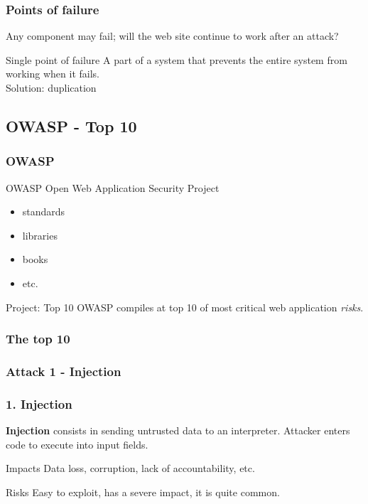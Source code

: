 
\begin{frame}
\frametitle{Points of failure}
Any component may fail; will the web site continue to work after an attack?
\begin{block}{Single point of failure}
A part of a system that prevents the entire system from working when it fails.
\\ Solution: duplication
\end{block}
\end{frame}

\subsection{OWASP - Top 10}

\begin{frame}
\frametitle{OWASP}
\begin{block}{OWASP}
\centering Open Web Application Security Project
\begin{itemize}
\item standards
\item libraries
\item books
\item etc.
\end{itemize}
\end{block}
\begin{block}{Project: Top 10}
OWASP compiles at top 10 of most critical web application \emph{risks}.
\end{block}
\end{frame}

\begin{frame}
\frametitle{The top 10}
\end{frame}

\subsubsection{Attack 1 - Injection}

\begin{frame}
\frametitle{1. Injection}
\textbf{Injection} consists in sending untrusted data to an interpreter.
Attacker enters code to execute into input fields.
\begin{block}{Impacts}
Data loss, corruption, lack of accountability, etc.
\end{block}
\begin{block}{Risks}
\alert{Easy to exploit}, has a \alert{severe impact}, it is quite common.
\end{block}
\end{frame}

